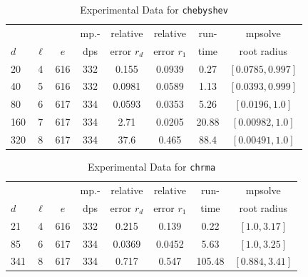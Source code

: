 \documentclass[runningheads]{llncs}
\begin{document}
\begin{table}
\caption{Experimental Data for \texttt{chebyshev}} %
\label{tab:chebyshev}
\vskip -0.15in
\begin{center}
\begin{small}
\begin{sc}
\begin{tabular}{lccccccc}
\toprule
&  &  & mp.-& relative  & relative & run- & mpsolve \\
$d$& $\ell$& $e$ & dps&error $r_d$       & error $r_1$ &time& root radius\\
\midrule
 20 & 4 & 616 & 332 & 0.155 & 0.0939 & 0.27 & $[0.0785, 0.997]$\\
 40 & 5 & 616 & 332 & 0.0981 & 0.0589 & 1.13 & $[0.0393, 0.999]$\\
 80 & 6 & 617 & 334 & 0.0593 & 0.0353 & 5.26 & $[0.0196, 1.0]$\\
 160 & 7 & 617 & 334 & 2.71 & 0.0205 & 20.88 & $[0.00982, 1.0]$\\
 320 & 8 & 617 & 334 & 37.6 & 0.465 & 88.4 & $[0.00491, 1.0]$\\
\bottomrule
\end{tabular}
\end{sc}
\end{small}
\end{center}
\vskip 0.05in
\end{table}

\begin{table}
\caption{Experimental Data for \texttt{chrma}} %
\label{tab:chrma}
\vskip -0.15in
\begin{center}
\begin{small}
\begin{sc}
\begin{tabular}{lccccccc}
\toprule
&  &  & mp.-& relative  & relative & run- & mpsolve \\
$d$& $\ell$& $e$ & dps&error $r_d$       & error $r_1$ &time& root radius\\
\midrule
 21 & 4 & 616 & 332 & 0.215 & 0.139 & 0.22 & $[1.0, 3.17]$\\
 85 & 6 & 617 & 334 & 0.0369 & 0.0452 & 5.63 & $[1.0, 3.25]$\\
 341 & 8 & 617 & 334 & 0.717 & 0.547 & 105.48 & $[0.884, 3.41]$\\
\bottomrule
\end{tabular}
\end{sc}
\end{small}
\end{center}
\vskip 0.05in
\end{table}
\end{document}
